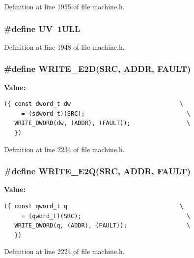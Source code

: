 Definition at line 1955 of file machine.h.
\subsubsection[{UV}]{\setlength{\rightskip}{0pt plus 5cm}\#define UV~1ULL}\label{machine_8h_98c13c051d56ec52eebf7732f621b146}




Definition at line 1948 of file machine.h.
\subsubsection[{WRITE\_\-E2D}]{\setlength{\rightskip}{0pt plus 5cm}\#define WRITE\_\-E2D(SRC, \/  ADDR, \/  FAULT)}\label{machine_8h_53d8fab8142e49e161f1187a7dcc4259}


\textbf{Value:}

\begin{Code}\begin{verbatim}({ const dword_t dw                               \
     = (sdword_t)(SRC);                             \
   WRITE_DWORD(dw, (ADDR), (FAULT));                \
   })
\end{verbatim}
\end{Code}


Definition at line 2234 of file machine.h.
\subsubsection[{WRITE\_\-E2Q}]{\setlength{\rightskip}{0pt plus 5cm}\#define WRITE\_\-E2Q(SRC, \/  ADDR, \/  FAULT)}\label{machine_8h_d5702ab5178c077a2e283ab36066beb2}


\textbf{Value:}

\begin{Code}\begin{verbatim}({ const qword_t q                                \
     = (qword_t)(SRC);                              \
   WRITE_QWORD(q, (ADDR), (FAULT));                 \
   })
\end{verbatim}
\end{Code}


Definition at line 2224 of file machine.h.
